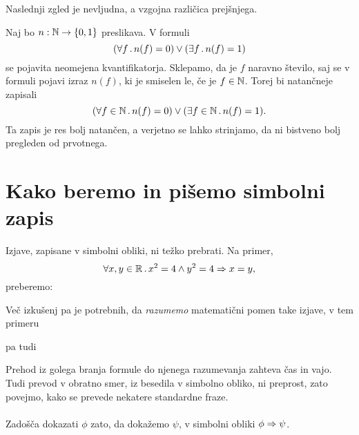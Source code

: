 Naslednji zgled je nevljudna, a vzgojna različica prejšnjega.

\begin{zgled}
  Naj bo $n : \mathbb{N} \to \left\{0, 1\right\}$ preslikava. V formuli
  \begin{equation*}
    (\forall f \,.\, n(f) = 0) \lor (\exists f \,.\, n(f) = 1)
  \end{equation*}
  se pojavita neomejena kvantifikatorja. Sklepamo, da je $f$ naravno število, saj se v formuli pojavi izraz $n(f)$,
  ki je smiselen le, če je $f \in \mathbb{N}$. Torej bi natančneje zapisali
  \begin{equation*}
    (\forall f \in \mathbb{N} \,.\, n(f) = 0) \lor (\exists f \in \mathbb{N} \,.\, n(f) = 1).
  \end{equation*}
  Ta zapis je res bolj natančen, a verjetno se lahko strinjamo, da ni bistveno bolj pregleden od prvotnega.
\end{zgled}




\section{Kako beremo in pišemo simbolni zapis}
\label{sec:simbolni-zapis}

Izjave, zapisane v simbolni obliki, ni težko prebrati. Na primer,
%
\begin{equation*}
  \forall x, y \in \mathbb{R} \,.\,
    x^2 = 4 \land y^2 = 4 \Rightarrow x = y,
\end{equation*}
%
preberemo:
%
\begin{quote}
\end{quote}
%
Več izkušenj pa je potrebnih, da \emph{razumemo} matematični pomen
take izjave, v tem primeru
%
\begin{quote}
\end{quote}
%
pa tudi
%
\begin{quote}
\end{quote}
%
Prehod iz golega branja formule do njenega razumevanja zahteva čas in vajo.
Tudi prevod v obratno smer, iz besedila v simbolno obliko, ni preprost,
zato povejmo, kako se prevede nekatere standardne fraze.

\paragraph{}
%
Zadošča dokazati $\phi$ zato, da dokažemo $\psi$, v simbolni obliki $\phi \Rightarrow \psi$.

